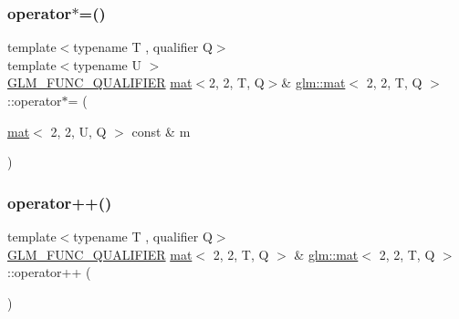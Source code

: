 \mbox{\label{structglm_1_1mat_3_012_00_012_00_01_t_00_01_q_01_4_a1abaf7d5f1778b770aea62171ba17a29}} 
\subsubsection{\texorpdfstring{operator$\ast$=()}{operator*=()}\hspace{0.1cm}{\footnotesize\ttfamily [4/4]}}
{\footnotesize\ttfamily template$<$typename T , qualifier Q$>$ \\
template$<$typename U $>$ \\
\mbox{\hyperlink{setup_8hpp_a33fdea6f91c5f834105f7415e2a64407}{G\+L\+M\+\_\+\+F\+U\+N\+C\+\_\+\+Q\+U\+A\+L\+I\+F\+I\+ER}} \mbox{\hyperlink{structglm_1_1mat}{mat}}$<$2, 2, T, Q$>$\& \mbox{\hyperlink{structglm_1_1mat}{glm\+::mat}}$<$ 2, 2, T, Q $>$\+::operator$\ast$= (\begin{DoxyParamCaption}\item[{\mbox{\hyperlink{structglm_1_1mat}{mat}}$<$ 2, 2, U, Q $>$ const \&}]{m }\end{DoxyParamCaption})}

\mbox{\label{structglm_1_1mat_3_012_00_012_00_01_t_00_01_q_01_4_a3ba78b4e4d01ba944fab26b8286acac4}} 
\subsubsection{\texorpdfstring{operator++()}{operator++()}\hspace{0.1cm}{\footnotesize\ttfamily [1/2]}}
{\footnotesize\ttfamily template$<$typename T , qualifier Q$>$ \\
\mbox{\hyperlink{setup_8hpp_a33fdea6f91c5f834105f7415e2a64407}{G\+L\+M\+\_\+\+F\+U\+N\+C\+\_\+\+Q\+U\+A\+L\+I\+F\+I\+ER}} \mbox{\hyperlink{structglm_1_1mat}{mat}}$<$ 2, 2, T, Q $>$ \& \mbox{\hyperlink{structglm_1_1mat}{glm\+::mat}}$<$ 2, 2, T, Q $>$\+::operator++ (\begin{DoxyParamCaption}{ }\end{DoxyParamCaption})}

